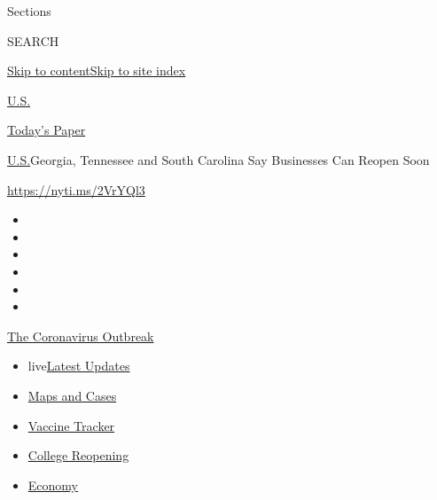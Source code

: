 Sections

SEARCH

\protect\hyperlink{site-content}{Skip to
content}\protect\hyperlink{site-index}{Skip to site index}

\href{https://www.nytimes.com/section/us}{U.S.}

\href{https://myaccount.nytimes.com/auth/login?response_type=cookie\&client_id=vi}{}

\href{https://www.nytimes.com/section/todayspaper}{Today's Paper}

\href{/section/us}{U.S.}\textbar{}Georgia, Tennessee and South Carolina
Say Businesses Can Reopen Soon

\url{https://nyti.ms/2VrYQl3}

\begin{itemize}
\item
\item
\item
\item
\item
\item
\end{itemize}

\href{https://www.nytimes.com/news-event/coronavirus?action=click\&pgtype=Article\&state=default\&region=TOP_BANNER\&context=storylines_menu}{The
Coronavirus Outbreak}

\begin{itemize}
\tightlist
\item
  live\href{https://www.nytimes.com/2020/08/04/world/coronavirus-cases.html?action=click\&pgtype=Article\&state=default\&region=TOP_BANNER\&context=storylines_menu}{Latest
  Updates}
\item
  \href{https://www.nytimes.com/interactive/2020/us/coronavirus-us-cases.html?action=click\&pgtype=Article\&state=default\&region=TOP_BANNER\&context=storylines_menu}{Maps
  and Cases}
\item
  \href{https://www.nytimes.com/interactive/2020/science/coronavirus-vaccine-tracker.html?action=click\&pgtype=Article\&state=default\&region=TOP_BANNER\&context=storylines_menu}{Vaccine
  Tracker}
\item
  \href{https://www.nytimes.com/2020/08/02/us/covid-college-reopening.html?action=click\&pgtype=Article\&state=default\&region=TOP_BANNER\&context=storylines_menu}{College
  Reopening}
\item
  \href{https://www.nytimes.com/live/2020/08/04/business/stock-market-today-coronavirus?action=click\&pgtype=Article\&state=default\&region=TOP_BANNER\&context=storylines_menu}{Economy}
\end{itemize}

